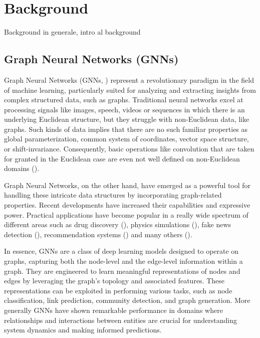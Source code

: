 \documentclass[binding=0.6cm]{sapthesis}
\newcommand{\mycite}[1]{(\cite{#1})}
\begin{document}
\chapter{Background}
\label{chap:2-background}
Background in generale, intro al background

\section{Graph Neural Networks (GNNs)}
\label{sec:bg.gnn}
Graph Neural Networks (GNNs, \cite{gnnModel2009}) represent a revolutionary paradigm in the field of machine learning, particularly suited for analyzing and extracting insights from complex structured data, such as graphs. Traditional neural networks excel at processing signals like images, speech, videos or sequences in which there is an underlying Euclidean structure, but they struggle with non-Euclidean data, like graphs. Such kinds of data implies that there are no such familiar properties as global parameterization, common system of coordinates, vector space structure, or shift-invariance. Consequently, basic operations like convolution that are taken for granted in the Euclidean case are even not well defined on non-Euclidean domains \mycite{Bronstein_2017}. 

Graph Neural Networks, on the other hand, have emerged as a powerful tool for handling these intricate data structures by incorporating graph-related properties. Recent developments have increased their capabilities and expressive power. Practical applications have become popular in a really wide spectrum of different areas such as drug discovery \mycite{doi:10.1021/acs.jmedchem.9b00959}, physics simulations \mycite{sanchezgonzalez2020learning}, fake news detection \mycite{monti2019fake}, recommendation systems \mycite{eksombatchai2017pixie} and many others \mycite{hamilton2020graph}.

In essence, GNNs are a class of deep learning models designed to operate on graphs, capturing both the node-level and the edge-level information within a graph. They are engineered to learn meaningful representations of nodes and edges by leveraging the graph's topology and associated features. These representations can be exploited in performing various tasks, such as node classification, link prediction, community detection, and graph generation. More generally GNNs have shown remarkable performance in domains where relationships and interactions between entities are crucial for understanding system dynamics and making informed predictions.
\end{document}
